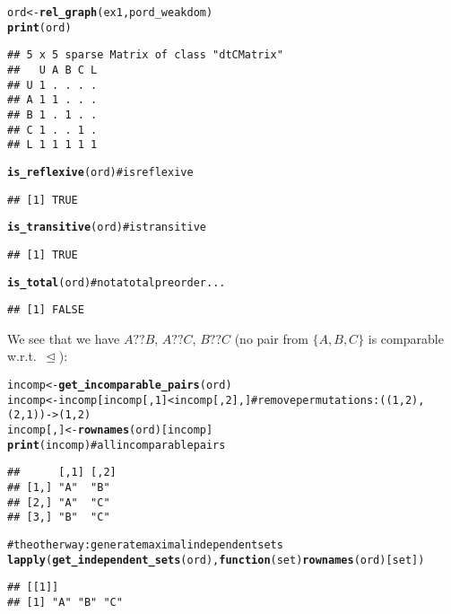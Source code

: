 \documentclass[11pt]{article}\usepackage{graphicx, color}
\makeatletter
\newcommand{\hlfunctioncall}[1]{\textcolor[rgb]{0.501960784313725,0,0.329411764705882}{\textbf{#1}}}%
\newcommand{\hlcomment}[1]{\textcolor[rgb]{0.180392156862745,0.6,0.341176470588235}{#1}}%
\newenvironment{kframe}{%
 \def\at@end@of@kframe{}%
 \ifinner\ifhmode%
  \def\at@end@of@kframe{\end{minipage}}%
  \begin{minipage}{\columnwidth}%
 \fi\fi%
 \def\FrameCommand##1{\hskip\@totalleftmargin \hskip-\fboxsep
 \colorbox{shadecolor}{##1}\hskip-\fboxsep
     \hskip-\linewidth \hskip-\@totalleftmargin \hskip\columnwidth}%
 \MakeFramed {\advance\hsize-\width
   \@totalleftmargin\z@ \linewidth\hsize
   \@setminipage}}%
 {\par\unskip\endMakeFramed%
 \at@end@of@kframe}
\newenvironment{knitrout}{}{} %
\theoremstyle{remark}
\theoremstyle{definition}
\makeatother
\begin{document}
\begin{knitrout}\small
{}\color{fgcolor}\begin{kframe}
\begin{alltt}
ord <- \hlfunctioncall{rel_graph}(ex1, pord_weakdom)
\hlfunctioncall{print}(ord)
\end{alltt}
\begin{verbatim}
## 5 x 5 sparse Matrix of class "dtCMatrix"
##   U A B C L
## U 1 . . . .
## A 1 1 . . .
## B 1 . 1 . .
## C 1 . . 1 .
## L 1 1 1 1 1
\end{verbatim}
\begin{alltt}
\hlfunctioncall{is_reflexive}(ord)  \hlcomment{# is reflexive}
\end{alltt}
\begin{verbatim}
## [1] TRUE
\end{verbatim}
\begin{alltt}
\hlfunctioncall{is_transitive}(ord) \hlcomment{# is transitive}
\end{alltt}
\begin{verbatim}
## [1] TRUE
\end{verbatim}
\begin{alltt}
\hlfunctioncall{is_total}(ord)      \hlcomment{# not a total preorder...}
\end{alltt}
\begin{verbatim}
## [1] FALSE
\end{verbatim}
\end{kframe}
\end{knitrout}


\noindent
We see that we have $A \text{??} B$, $A \text{??} C$,
$B \text{??} C$ (no pair from $\{A,B,C\}$ is comparable
w.r.t.~$\trianglelefteq$):

\begin{knitrout}\small
{}\color{fgcolor}\begin{kframe}
\begin{alltt}
incomp <- \hlfunctioncall{get_incomparable_pairs}(ord)
incomp <- incomp[incomp[,1]<incomp[,2],] \hlcomment{# remove permutations: ((1,2), (2,1))->(1,2)}
incomp[,] <- \hlfunctioncall{rownames}(ord)[incomp]
\hlfunctioncall{print}(incomp) \hlcomment{# all incomparable pairs}
\end{alltt}
\begin{verbatim}
##      [,1] [,2]
## [1,] "A"  "B" 
## [2,] "A"  "C" 
## [3,] "B"  "C"
\end{verbatim}
\begin{alltt}
\hlcomment{# the other way: generate maximal independent sets}
\hlfunctioncall{lapply}(\hlfunctioncall{get_independent_sets}(ord), \hlfunctioncall{function}(set) \hlfunctioncall{rownames}(ord)[set]) 
\end{alltt}
\begin{verbatim}
## [[1]]
## [1] "A" "B" "C"
\end{verbatim}
\end{kframe}
\end{knitrout}
\end{document}
